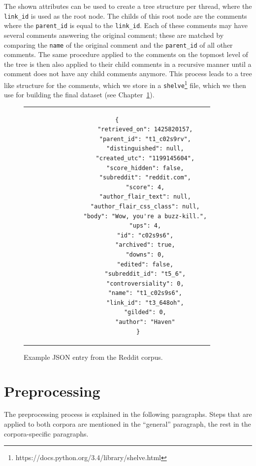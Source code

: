 The shown attributes can be used to create a tree structure per thread, where the \texttt{link\_id} is used as the root node. The childs of this root node are the comments where the \texttt{parent\_id} is equal to the \texttt{link\_id}. Each of these comments may have several comments answering the original comment; these are matched by comparing the \texttt{name} of the original comment and the \texttt{parent\_id} of all other comments. The same procedure applied to the comments on the topmost level of the tree is then also applied to their child comments in a recursive manner until a comment does not have any child comments anymore. This process leads to a tree like structure for the comments, which we store in a \texttt{shelve}\footnote{https://docs.python.org/3.4/library/shelve.html} file, which we then use for building the final dataset (see Chapter~\ref{data:preprocessing}).
\\
\begin{figure}[thp]
	\centering
	\begin{tabular}{c}  %
		\begin{lstlisting}[style=json]
			{
				"retrieved_on": 1425820157,
				"parent_id": "t1_c02s9rv",
				"distinguished": null,
				"created_utc": "1199145604",
				"score_hidden": false,
				"subreddit": "reddit.com",
				"score": 4,
				"author_flair_text": null,
				"author_flair_css_class": null,
				"body": "Wow, you're a buzz-kill.",
				"ups": 4,
				"id": "c02s9s6",
				"archived": true,
				"downs": 0,
				"edited": false,
				"subreddit_id": "t5_6",
				"controversiality": 0,
				"name": "t1_c02s9s6",
				"link_id": "t3_648oh",
				"gilded": 0,
				"author": "Haven"
			}
		\end{lstlisting}
	\end{tabular}
	\label{data:reddit:json_example}
	\caption{Example JSON entry from the Reddit corpus.}
\end{figure}

\section{Preprocessing}
\label{data:preprocessing}
The preprocessing process is explained in the following paragraphs. Steps that are applied to both corpora are mentioned in the ``general'' paragraph, the rest in the corpora-specific paragraphs.


